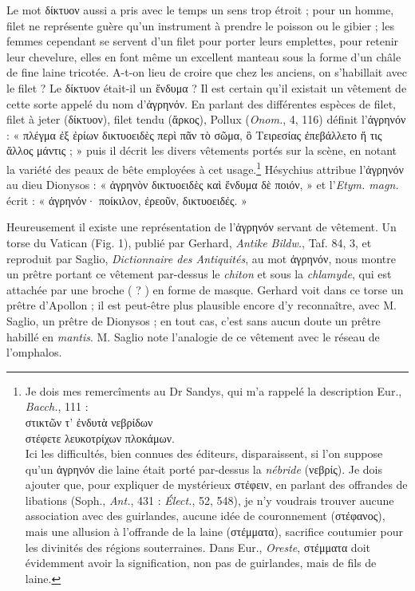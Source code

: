 \documentclass[a4paper, 11pt, oneside, polutonikogreek, french]{article}
\begin{document}
Le mot δίκτυον aussi a pris avec le temps un sens trop étroit ; pour un homme, filet ne représente guère qu'un instrument à prendre le poisson ou le gibier ; les femmes cependant se servent d'un filet pour porter leurs emplettes, pour retenir leur chevelure, elles en font même un excellent manteau sous la forme d'un châle de fine laine tricotée. A-t-on lieu de croire que chez les anciens, on s'habillait avec le filet ? Le δίκτυον était-il un ἔνδυμα ? Il est certain qu'il existait un vêtement de cette sorte appelé du nom d'ἀγρηνόν. En parlant des différentes espèces de filet, filet à jeter (δίκτυον), filet tendu (ἄρκος), Pollux (\emph{Onom.}, 4, 116) définit l'ἀγρηνόν : « πλέγμα ἐξ ἐρίων δικτυοειδὲς περὶ πᾶν τὸ σῶμα, ὃ Τειρεσίας ἐπεβάλλετο ἤ τις ἄλλος μάντις ; » puis il décrit les divers vêtements portés sur la scène, en notant la variété des peaux de bête employées à cet usage.\footnote{Je dois mes remercîments au Dr Sandys, qui m'a rappelé la description Eur., \emph{Bacch.}, 111 :\\\hspace*{10mm}στικτῶν τ' ἐνδυτὰ νεβρίδων\\\hspace*{10mm}στέφετε λευκοτρίχων πλοκάμων.\\\hspace*{10mm}Ici les difficultés, bien connues des éditeurs, disparaissent, si l'on suppose qu'un ἀγρηνόν die laine était porté par-dessus la \emph{nébride} (νεβρίς). Je dois ajouter que, pour expliquer de mystérieux στέφειν, en parlant des offrandes de libations (Soph., \emph{Ant.}, 431 : \emph{Élect.}, 52, 548), je n'y voudrais trouver aucune association avec des guirlandes, aucune idée de couronnement (στέφανος), mais une allusion à l'offrande de la laine (στέμματα), sacrifice coutumier pour les divinités des régions souterraines. Dans Eur., \emph{Oreste}, στέμματα doit évidemment avoir la signification, non pas de guirlandes, mais de fils de laine.} Hésychius attribue l'ἀγρηνόν au dieu Dionysos : « ἀγρηνὸν δικτυοειδὲς καὶ ἔνδυμα δὲ ποιόν, » et l'\emph{Etym. magn.} écrit : « ἀγρηνόν· ποίκιλον, ἐρεοῦν, δικτυοειδές. »

Heureusement il existe une représentation de l'ἀγρηνόν servant de vêtement. Un torse du Vatican (Fig. 1), publié par Gerhard, \emph{Antike Bildw.}, Taf. 84, 3, et reproduit par Saglio, \emph{Dictionnaire des Antiquités}, au mot ἀγρηνόν, nous montre un prêtre portant ce vêtement par-dessus le \emph{chiton} et sous la \emph{chlamyde}, qui est attachée par une broche ( ? ) en forme de masque. Gerhard voit dans ce torse un prêtre d'Apollon ; il est peut-être plus plausible encore d'y reconnaître, avec M. Saglio, un prêtre de Dionysos ; en tout cas, c'est sans aucun doute un prêtre habillé en \emph{mantis}. M. Saglio note l'analogie de ce vêtement avec le réseau de l'omphalos.
\end{document}
